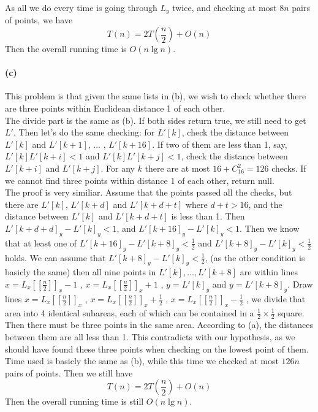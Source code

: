 \documentclass{6046}
\begin{document}
As all we do every time is going through $L_y$ twice, and checking at most 
$8n$ pairs of points, we have
$$T(n) = 2 T(\frac{n}{2}) + O(n)$$
Then the overall running time is $O(n\lg{n})$.

\paragraph{(c)}
This problem is that given the same lists in (b), 
we wish to check whether there are three points within Euclidean distance 1 of each other. 
\\

The divide part is the same as (b). 
If both sides return true, we still need to get $L'$. 
Then let's do the same checking: 
for $L'[k]$, check the distance between 
$L'[k]$ and $L'[k+1]$, ... , $L'[k+16]$. 
If two of them are less than 1, 
say, $L'[k]L'[k+i] < 1$ and $L'[k]L'[k+j] < 1$, 
check the distance between $L'[k+i]$ and $L'[k+j]$. 
For any $k$ there are at most $16 + C_{16}^2 = 126$ checks. 
If we cannot find three points within distance 1 of each other, return null. 
\\

The proof is very similiar. 
Assume that the points passed all the checks, but there are 
$L'[k]$, $L'[k+d]$ and $L'[k+d+t]$ 
where $d+t > 16$, and the distance between $L'[k]$ and $L'[k+d+t]$ is less than 1. 
Then $L'[k+d+d]_y - L'[k]_y < 1$, and 
$L'[k+16]_y - L'[k]_y < 1$. 
Then we know that at least one of 
$L'[k+16]_y - L'[k+8]_y < \frac{1}{2}$ and $L'[k+8]_y - L'[k]_y < \frac{1}{2}$
holds. 
We can assume that $L'[k+8]_y - L'[k]_y < \frac{1}{2}$, 
(as the other condition is basicly the same)
then all nine points in ${L'[k], ... , L'[k+8]}$ are 
within lines
$x = L_x[[\frac{n}{2}]]_x - 1$ ,  $x = L_x[[\frac{n}{2}]]_x + 1$ , 
$y = L'[k]_y$ and $y = L'[k+8]_y$. 
Draw lines 
$x = L_x[[\frac{n}{2}]]_x $ ,  $x = L_x[[\frac{n}{2}]]_x + \frac{1}{2}$ , 
$x = L_x[[\frac{n}{2}]]_x - \frac{1}{2}$ , 
we divide that area into 4 identical subareas, 
each of which can be contained in a $\frac{1}{2}\times \frac{1}{2}$ square. 
Then there must be three points in the same area. 
According to (a), the distances between them are all less than 1. 
This contradicts with our hypothesis, 
as we should have found these three points when checking on 
the lowest point of them. 
\\

Time used is basicly the same as (b), while this time we 
checked at most 
$126n$ pairs of points. 
Then we still have
$$T(n) = 2 T(\frac{n}{2}) + O(n)$$
Then the overall running time is still $O(n\lg{n})$.
\end{document}
